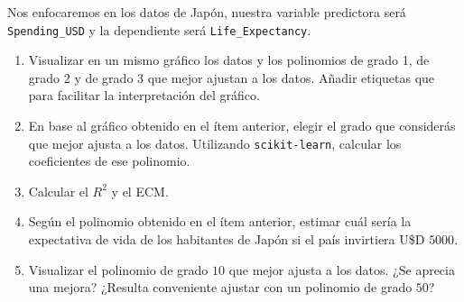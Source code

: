 \documentclass[a4paper,11pt]{article}
\theoremstyle{definition}
\begin{document}
\begin{enumerate}[resume]
Nos enfocaremos en los datos de Japón, nuestra variable predictora será \verb|Spending_USD| y la dependiente será \verb|Life_Expectancy|.
\begin{enumerate}
    \item Visualizar en un mismo gráfico los datos y los polinomios de grado 1, de grado 2 y de grado 3 que mejor ajustan a los datos. Añadir etiquetas que para facilitar la interpretación del gráfico.
    \item En base al gráfico obtenido en el ítem anterior, elegir el grado que considerás que mejor ajusta a los datos. Utilizando \verb|scikit-learn|, calcular los coeficientes de ese polinomio.
    \item Calcular el $R^2$ y el ECM.
    \item Según el polinomio obtenido en el ítem anterior, estimar cuál sería la expectativa de vida de los habitantes de Japón si el país invirtiera U\$D $5000$.
    \item Visualizar el polinomio de grado $10$ que mejor ajusta a los datos. ¿Se aprecia una mejora? ¿Resulta conveniente ajustar con un polinomio de grado $50$?
\end{enumerate}

\end{enumerate}
\end{document}

